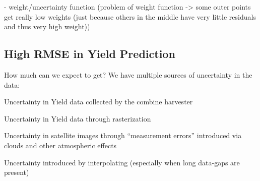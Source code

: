 {    - weight/uncertainty function 
    (problem of weight function -> some outer points get really low weights (just because others in the middle have very little residuals and thus very high weight))

    \subsection{High RMSE in Yield Prediction}{
        How much can we expect to get? We have multiple sources of uncertainty in the data:
        \begin{Nenumerate}
            \item Uncertainty in Yield data collected by the combine harvester
            \item Uncertainty in Yield data through rasterization
            \item Uncertainty in satellite images through ``measurement errors'' introduced via clouds and other atmospheric effects 
            \item Uncertainty introduced by interpolating (especially when long data-gaps are present)
        \end{Nenumerate}
    }
}

